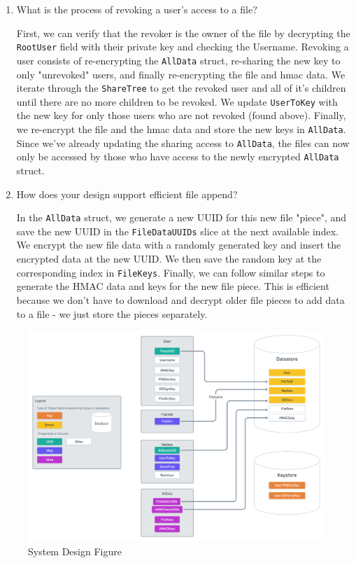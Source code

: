 \documentclass{article}
\begin{document}
\begin{enumerate}
        \item What is the process of revoking a user's access to a file?
        
        First, we can verify that the revoker is the owner of the file by decrypting the \texttt{RootUser} field with their private key and checking the Username. Revoking a user consists of re-encrypting the \texttt{AllData} struct, re-sharing the new key to only "unrevoked" users, and finally re-encrypting the file and hmac data. We iterate through the \texttt{ShareTree} to get the revoked user and all of it's children until there are no more children to be revoked. We update \texttt{UserToKey} with the new key for only those users who are not revoked (found above). Finally, we re-encrypt the file and the hmac data and store the new keys in \texttt{AllData}. Since we've already updating the sharing access to \texttt{AllData}, the files can now only be accessed by those who have access to the newly encrypted \texttt{AllData} struct. 
        
        \item How does your design support efficient file append?
        
         In the \texttt{AllData} struct, we generate a new UUID for this new file "piece", and save the new UUID in the \texttt{FileDataUUIDs} slice at the next available index. We encrypt the new file data with a randomly generated key and insert the encrypted data at the new UUID. We then save the random key at the corresponding index in \texttt{FileKeys}. Finally, we can follow similar steps to generate the HMAC data and keys for the new file piece. This is efficient because we don't have to download and decrypt older file pieces to add data to a file - we just store the pieces separately.
        
    \end{enumerate}


    \begin{figure}[H]
    \includegraphics[width=1\textwidth]{sys_design.png}
    \centering
    \caption{System Design Figure}
    \label{fig:sys}
    \end{figure}
\end{document}
